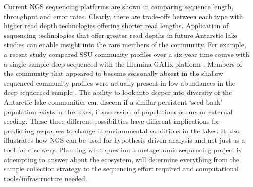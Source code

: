 Current \ac{NGS} sequencing platforms are shown in  comparing sequence length, throughput and error rates.
Clearly, there are trade-offs between each type with higher read depth technologies offering shorter read lengths. 
Application of sequencing technologies that offer greater read depths in future Antarctic lake studies can enable insight into the rare members of the community.
For example, a recent study compared \acs{SSU} community profiles over a six year time course with a single sample deep-sequenced with the Illumina GAIIx platform \cite{Caporaso2012}.
Members of the community that appeared to become seasonally absent in the shallow sequenced community profiles were actually present in low abundances in the deep-sequenced sample \cite{Caporaso2012}.
The ability to look into deeper into diversity of the Antarctic lake communities can discern if a similar persistent `seed bank' population exists in the lakes, if succession of populations occurs or external seeding.
These three different possibilities have different implications for predicting responses to change in environmental conditions in the lakes.
It also illustrates how \ac{NGS} can be used for hypothesis-driven analysis and not just as a tool for discovery.
Planning what question a metagenomic sequencing project is attempting to answer about the ecosystem, will determine everything from the sample collection strategy to the sequencing effort required and computational tools/infrastructure needed.


